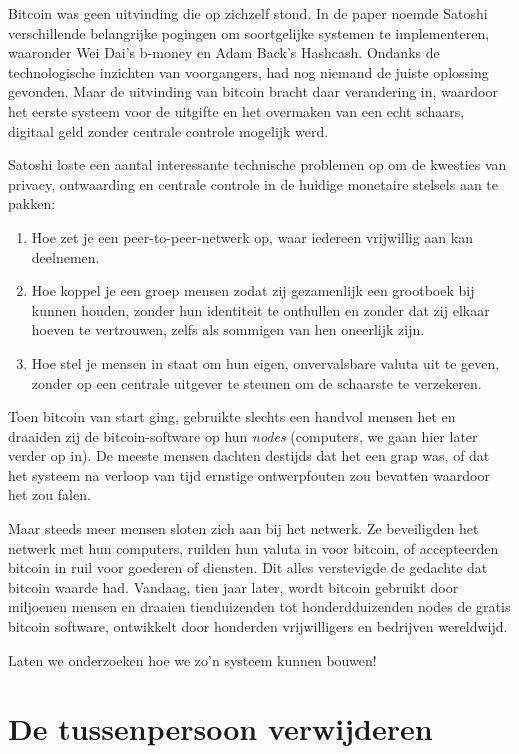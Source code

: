 \documentclass[
  letterpaper,
]{scrbook}
\begin{document}
Bitcoin was geen uitvinding die op zichzelf stond. In de paper noemde
Satoshi verschillende belangrijke pogingen om soortgelijke systemen te
implementeren, waaronder Wei Dai's b-money en Adam Back's Hashcash.
Ondanks de technologische inzichten van voorgangers, had nog niemand de
juiste oplossing gevonden. Maar de uitvinding van bitcoin bracht daar
verandering in, waardoor het eerste systeem voor de uitgifte en het
overmaken van een echt schaars, digitaal geld zonder centrale controle
mogelijk werd.

Satoshi loste een aantal interessante technische problemen op om de
kwesties van privacy, ontwaarding en centrale controle in de huidige
monetaire stelsels aan te pakken:

\begin{enumerate}
\def\labelenumi{\arabic{enumi}.}
\item
  Hoe zet je een peer-to-peer-netwerk op, waar iedereen vrijwillig aan
  kan deelnemen.
\item
  Hoe koppel je een groep mensen zodat zij gezamenlijk een grootboek bij
  kunnen houden, zonder hun identiteit te onthullen en zonder dat zij
  elkaar hoeven te vertrouwen, zelfs als sommigen van hen oneerlijk
  zijn.
\item
  Hoe stel je mensen in staat om hun eigen, onvervalsbare valuta uit te
  geven, zonder op een centrale uitgever te steunen om de schaarste te
  verzekeren.
\end{enumerate}

Toen bitcoin van start ging, gebruikte slechts een handvol mensen het en
draaiden zij de bitcoin-software op hun \emph{nodes} (computers, we gaan
hier later verder op in). De meeste mensen dachten destijds dat het een
grap was, of dat het systeem na verloop van tijd ernstige ontwerpfouten
zou bevatten waardoor het zou falen.

Maar steeds meer mensen sloten zich aan bij het netwerk. Ze beveiligden
het netwerk met hun computers, ruilden hun valuta in voor bitcoin, of
accepteerden bitcoin in ruil voor goederen of diensten. Dit alles
verstevigde de gedachte dat bitcoin waarde had. Vandaag, tien jaar
later, wordt bitcoin gebruikt door miljoenen mensen en draaien
tienduizenden tot honderdduizenden nodes de gratis bitcoin software,
ontwikkelt door honderden vrijwilligers en bedrijven wereldwijd.

Laten we onderzoeken hoe we zo'n systeem kunnen bouwen!


\hypertarget{de-tussenpersoon-verwijderen}{%
\chapter{De tussenpersoon
verwijderen}\label{de-tussenpersoon-verwijderen}}
\end{document}

